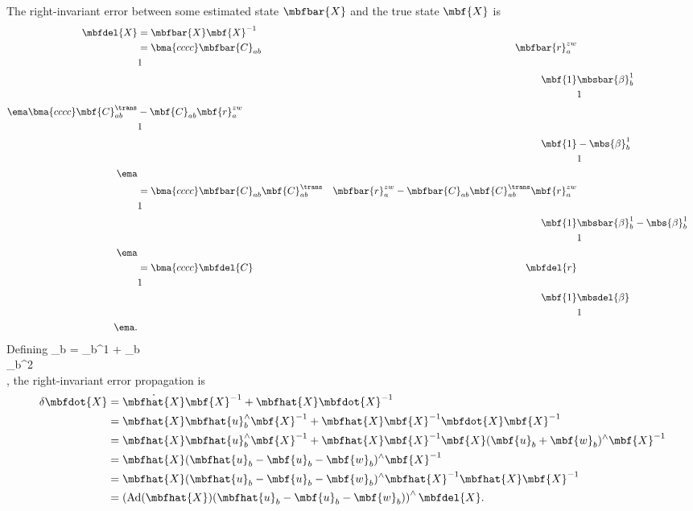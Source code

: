 The right-invariant error between some estimated state $\mbfbar{X}$ and the true state $\mbf{X}$ is 
\begin{align*}
	\mbfdel{X} &= \mbfbar{X}\mbf{X}^{-1} \\ 
	&= 
	\bma{cccc}
		\mbfbar{C}_{ab} & \mbfbar{r}_a^{zw} & & \\
		& 1 & & \\
		& & \mbf{1} & \mbsbar{\beta}_b^1\\	
		& & & 1  \\
	\ema
	\bma{cccc}
		\mbf{C}_{ab}^\trans & -\mbf{C}_{ab}\mbf{r}_a^{zw} & & \\
		& 1 & & \\
		& & \mbf{1} & -\mbs{\beta}_b^1\\	
		& & & 1  \\
	\ema \\
	&= 
	\bma{cccc}
		\mbfbar{C}_{ab}\mbf{C}_{ab}^\trans & \mbfbar{r}_a^{zw} - \mbfbar{C}_{ab}\mbf{C}_{ab}^\trans\mbf{r}_a^{zw} & & \\
		& 1 & & \\
		& & \mbf{1} & \mbsbar{\beta}_b^1 -\mbs{\beta}_b^1\\	
		& & & 1  \\
	\ema \\
	&=
	\bma{cccc}
		\mbfdel{C} & \mbfdel{r}  & & \\
		& 1 & & \\
		& & \mbf{1} & \mbsdel{\beta} \\	
		& & & 1  \\
	\ema.
\end{align*}
Defining
\bdis
	_b = 
		_b^1 + \mbshat{\beta}_b \\
		_b^2 \\
	\ema,
\edis
the right-invariant error propagation is
\begin{align*}
	\delta \mbfdot{X} &= \dot{\mbfhat{X}}\mbf{X}^{-1} + \mbfhat{X}\mbfdot{X}^{-1} \\ 
	&= \mbfhat{X}\mbfhat{u}_b^\wedge\mbf{X}^{-1} + \mbfhat{X}\mbf{X}^{-1}\mbfdot{X}\mbf{X}^{-1} \\
	&= \mbfhat{X}\mbfhat{u}_b^\wedge\mbf{X}^{-1} + \mbfhat{X}\mbf{X}^{-1}\mbf{X}(\mbf{u}_b + \mbf{w}_b)^\wedge\mbf{X}^{-1} \\
	&= \mbfhat{X}(\mbfhat{u}_b - \mbf{u}_b - \mbf{w}_b)^\wedge\mbf{X}^{-1} \\
	&= \mbfhat{X}(\mbfhat{u}_b - \mbf{u}_b - \mbf{w}_b)^\wedge\mbfhat{X}^{-1}\mbfhat{X}\mbf{X}^{-1} \\
	&= \left(\textrm{Ad}(\mbfhat{X})(\mbfhat{u}_b - \mbf{u}_b - \mbf{w}_b)\right)^\wedge\mbfdel{X}.
\end{align*}
